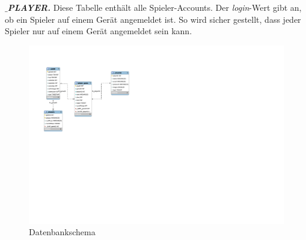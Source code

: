 \documentclass[12pt, a4paper]{article}
\begin{document}
\textbf{\textit{$\_$PLAYER.}}
Diese Tabelle enthält alle Spieler-Accounts. Der \textit{login}-Wert gibt an, ob ein Spieler auf einem Gerät angemeldet ist. So wird sicher gestellt, dass jeder Spieler nur auf einem Gerät angemeldet sein kann.  

\begin{figure}[] 
  \centering
     \includegraphics[height = 10 cm, width = 14cm]{DB_Schema}
  \caption{Datenbankschema}
\end{figure}	
\end{document}
